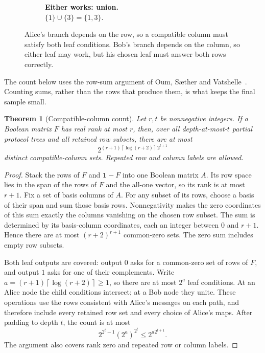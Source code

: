 \documentclass[11pt]{article} \usepackage[utf8]{inputenc}
\theoremstyle{plain} \newtheorem{theorem}{Theorem}[section]
\theoremstyle{definition} \newaliascnt{definition}{theorem}
\newcommand{\ceil}[1]{\left\lceil#1\right\rceil}
\begin{document}
\begin{figure}[H]
\begin{subfigure}[t]{.48\linewidth}
\caption{\textbf{Either works: union.}\\
$\{1\}\cup\{3\}=\{1,3\}$.}
\end{subfigure}
\caption{Alice's branch depends on the row, so a compatible column must
satisfy both leaf conditions. Bob's branch depends on the column, so either
leaf may work, but his chosen leaf must answer both rows correctly.}
\label{fig:compatible-trees}
\end{figure}

The count below uses the row-sum argument of Oum, S{\ae}ther and
Vatshelle~\cite[Theorem~4.2]{oum2014faster}. Counting sums, rather than the rows
that produce them, is what keeps the final sample small.

\begin{theorem}[Compatible-column count]\label{thm:rank-count}
Let $r,t$ be nonnegative integers. If a Boolean matrix $F$ has real rank at most
$r$, then, over all depth-at-most-$t$ partial protocol trees and all retained
row subsets, there are at most
\begin{equation}\label{eq:rank-count}
 2^{(r+1)\ceil{\log(r+2)}\,2^{t+1}}
\end{equation}
distinct compatible-column sets. Repeated row and column labels are allowed.
\end{theorem}
\begin{proof}
Stack the rows of $F$ and $\mathbf1-F$ into one Boolean matrix $A$. Its row
space lies in the span of the rows of $F$ and the all-one vector, so its rank
is at most $r+1$. Fix a set of basis columns of $A$. For any subset of its
rows, choose a basis of their span and sum those basis rows. Nonnegativity
makes the zero coordinates of this sum exactly the columns vanishing on the
chosen row subset. The sum is determined by its basis-column coordinates,
each an integer between $0$ and $r+1$. Hence there are at most
$(r+2)^{r+1}$ common-zero sets. The zero sum includes empty row subsets.

Both leaf outputs are covered: output $0$ asks for a common-zero set of rows
of $F$, and output $1$ asks for one of their complements. Write
$a=(r+1)\ceil{\log(r+2)}\ge1$, so there are at most $2^a$ leaf conditions.
At an Alice node the child conditions intersect; at a Bob node they unite.
These operations use the rows consistent with Alice's messages on each path,
and therefore include every retained row set and every choice of Alice's maps.
After padding to depth $t$, the count is at most
\[
2^{2^t-1}(2^a)^{2^t}\le2^{a2^{t+1}}.
\]
The argument also covers rank zero and repeated row or column labels.
\end{proof}
\end{document}
